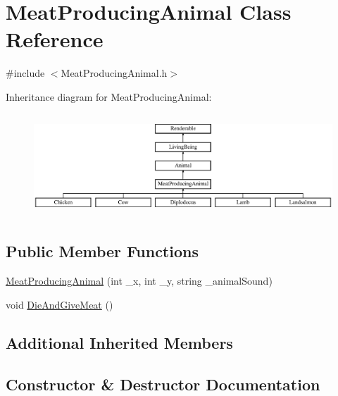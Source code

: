 \hypertarget{classMeatProducingAnimal}{}\section{Meat\+Producing\+Animal Class Reference}
\label{classMeatProducingAnimal}


{\ttfamily \#include $<$Meat\+Producing\+Animal.\+h$>$}

Inheritance diagram for Meat\+Producing\+Animal\+:\begin{figure}[H]
\begin{center}
\leavevmode
\includegraphics[height=3.888889cm]{classMeatProducingAnimal}
\end{center}
\end{figure}
\subsection*{Public Member Functions}
\begin{DoxyCompactItemize}
\item 
\mbox{\hyperlink{classMeatProducingAnimal_a6d4d1eeff935695331bae48fd17fb4e1}{Meat\+Producing\+Animal}} (int \+\_\+x, int \+\_\+y, string \+\_\+animal\+Sound)
\item 
void \mbox{\hyperlink{classMeatProducingAnimal_a650fb47769f851ca11171d217bf78ef6}{Die\+And\+Give\+Meat}} ()
\end{DoxyCompactItemize}
\subsection*{Additional Inherited Members}


\subsection{Constructor \& Destructor Documentation}
\mbox{\label{classMeatProducingAnimal_a6d4d1eeff935695331bae48fd17fb4e1}} 
